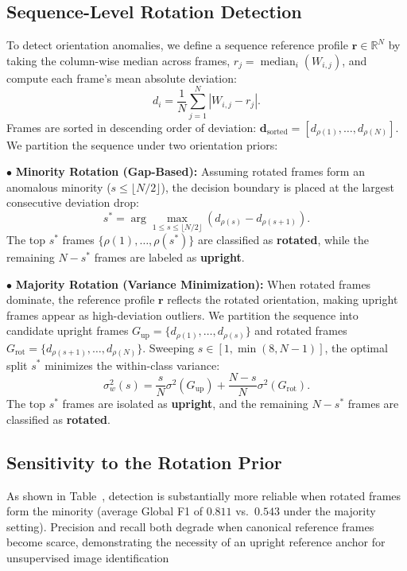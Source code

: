 \subsection{Sequence-Level Rotation Detection}
To detect orientation anomalies, we define a sequence reference profile $\mathbf{r} \in \mathbb{R}^N$ by taking the column-wise median across frames, $r_j = \operatorname{median}_{i}(W_{i,j})$, and compute each frame's mean absolute deviation:
\begin{equation}
d_i = \frac{1}{N} \sum_{j=1}^{N} |W_{i,j} - r_j|.
\end{equation}
Frames are sorted in descending order of deviation: $\mathbf{d}_{\text{sorted}} = [d_{\rho(1)}, \dots, d_{\rho(N)}]$. We partition the sequence under two orientation priors:

$\bullet$ \textbf{Minority Rotation (Gap-Based):} Assuming rotated frames form an anomalous minority ($s \le \lfloor N/2 \rfloor$), the decision boundary is placed at the largest consecutive deviation drop:
    \begin{equation}
    s^* = \arg\max_{1 \le s \le \lfloor N/2 \rfloor} (d_{\rho(s)} - d_{\rho(s+1)}).
    \end{equation}
    The top $s^*$ frames $\{\rho(1), \dots, \rho(s^*)\}$ are classified as \textbf{rotated}, while the remaining $N - s^*$ frames are labeled as \textbf{upright}.

$\bullet$ \textbf{Majority Rotation (Variance Minimization):} When rotated frames dominate, the reference profile $\mathbf{r}$ reflects the rotated orientation, making upright frames appear as high-deviation outliers. We partition the sequence into candidate upright frames $G_{\text{up}} = \{d_{\rho(1)}, \dots, d_{\rho(s)}\}$ and rotated frames $G_{\text{rot}} = \{d_{\rho(s+1)}, \dots, d_{\rho(N)}\}$. Sweeping $s \in [1, \min(8, N-1)]$, the optimal split $s^*$ minimizes the within-class variance:
    \begin{equation}
    \sigma^2_w(s) = \frac{s}{N} \sigma^2(G_{\text{up}}) + \frac{N - s}{N} \sigma^2(G_{\text{rot}}).
    \end{equation}
    The top $s^*$ frames are isolated as \textbf{upright}, and the remaining $N - s^*$ frames are classified as \textbf{rotated}.


\subsection{Sensitivity to the Rotation Prior}
As shown in Table~, detection is substantially more reliable when rotated frames form the minority (average Global F1 of $0.811$ vs.\ $0.543$ under the majority setting). Precision and recall both degrade when canonical reference frames become scarce, demonstrating the necessity of an upright reference anchor for unsupervised image identification

